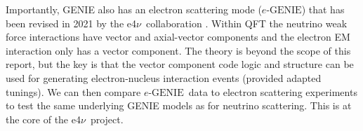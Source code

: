 \documentclass[a4paper,12pt]{article}
\newcommand{\efn}{e4$\nu$}
\newcommand{\eGEN}{$e\text{-GENIE}$}
\begin{document}
Importantly, GENIE also has an electron scattering mode (\eGEN) that has been revised in 2021 by the \efn\ collaboration \cite{e4ncollaborationInclusiveElectronScattering2021}.
Within QFT the neutrino weak force interactions have vector and axial-vector components and the electron EM interaction only has a vector component.
The theory is beyond the scope of this report, but the key is that the vector component code logic and structure can be used for generating electron-nucleus interaction events (provided adapted tunings).
We can then compare \eGEN\ data to electron scattering experiments to test the same underlying GENIE models as for neutrino scattering.
This is at the core of the \efn\ project.

\end{document}
